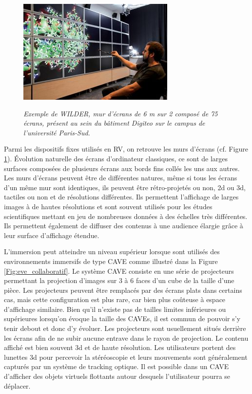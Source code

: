 \begin{figure}
  \centering
  {\includegraphics[width=.65\linewidth]{./figures/ch2/screen_wall}}
    \caption[Mur d'écrans WILDER.]{{\it Exemple de WILDER, mur d'écrans de 6 m sur 2 composé de 75 écrans, présent au sein du bâtiment Digiteo sur le campus de l'université Paris-Sud.}}
  \label{Fig:screen_wall}
  \hspace{0.3cm}
\end{figure}

Parmi les dispositifs fixes utilisés en RV, on retrouve les murs d'écrans (cf. Figure \ref{Fig:screen_wall}). Évolution naturelle des écrans d'ordinateur classiques, ce sont de larges surfaces composées de plusieurs écrans aux bords fins collés les uns aux autres. Les murs d'écrans peuvent être de différentes natures, même si tous les écrans d'un même mur sont identiques, ils peuvent être rétro-projetés ou non, 2d ou 3d, tactiles ou non et de résolutions différentes. Ils permettent l'affichage de larges images à de hautes résolutions et sont souvent utilisés pour les études scientifiques mettant en jeu de nombreuses données à des échelles très différentes. Ils permettent également de diffuser des contenus à une audience élargie grâce à leur surface d'affichage étendue.

L'immersion peut atteindre un niveau supérieur lorsque sont utilisés des environnements immersifs de type CAVE \cite{cruz-neira_cave:_1992} comme illustré dans la Figure \ref{Fig:eve_collaboratif}. Le système CAVE consiste en une série de projecteurs permettant la projection d'images sur 3 à 6 faces d'un cube de la taille d'une pièce. Les projecteurs peuvent être remplacés par des écrans plats dans certains cas, mais cette configuration est plus rare, car bien plus coûteuse à espace d'affichage similaire. Bien qu'il n'existe pas de tailles limites inférieures ou supérieures lorsqu'on évoque la taille des CAVEs, il est commun de pouvoir s'y tenir debout et donc d'y évoluer. Les projecteurs sont usuellement situés derrière les écrans afin de ne subir aucune entrave dans le rayon de projection. Le contenu affiché est bien souvent 3d et de haute résolution. Les utilisateurs portent des lunettes 3d pour percevoir la stéréoscopie et leurs mouvements sont généralement capturés par un système de tracking optique. Il est possible dans un CAVE d'afficher des objets virtuels flottants autour desquels l'utilisateur pourra se déplacer.

